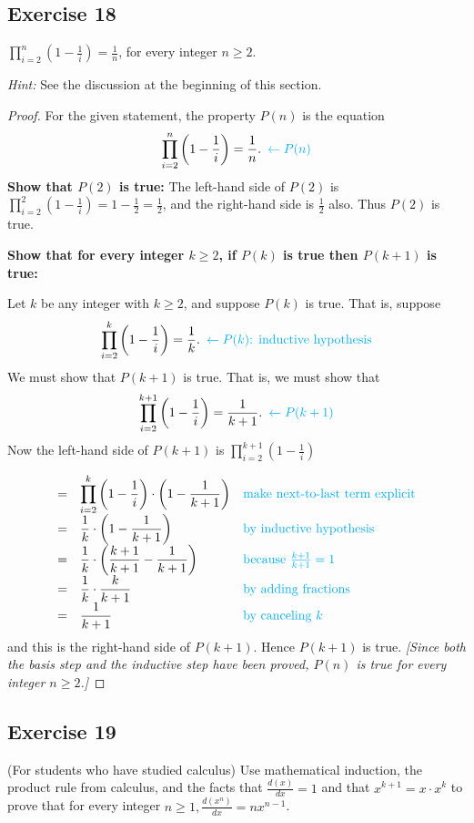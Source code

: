 \documentclass[14pt]{extarticle}
\newcommand{\dps}{\displaystyle}
\newcommand{\from}{\leftarrow}
\newcommand{\cy}{\color{cyan}}
\begin{document}
\subsection{Exercise 18}
$\dps \prod_{i=2}^{n}\left(1 - \frac{1}{i}\right) = \frac{1}{n}$, for every integer $n \geq 2$.

{\it Hint:} See the discussion at the beginning of this section.

\begin{proof}
For the given statement, the property $P(n)$ is the equation
\[
\dps \prod_{i=2}^{n}\left(1 - \frac{1}{i}\right) = \frac{1}{n}. \,\,\, {\cy \from P(n)}
\]
{\bf Show that $P(2)$ is true:} The left-hand side of $P(2)$ is $\dps \prod_{i=2}^{2}\left(1 - \frac{1}{i}\right) = 1 - \frac{1}{2} = \frac{1}{2}$, and the right-hand side is $\dps \frac{1}{2}$ also. Thus $P(2)$ is true.

{\bf Show that for every integer $k \geq 2$, if $P(k)$ is true then $P(k + 1)$ is true:}

Let $k$ be any integer with $k \geq 2$, and suppose $P(k)$ is true. That is, suppose
\[
\dps \prod_{i=2}^{k}\left(1 - \frac{1}{i}\right) = \frac{1}{k}. \,\,\, {\cy \from P(k) \text{: inductive hypothesis}}
\]
We must show that $P(k + 1)$ is true. That is, we must show that
\[
\dps \prod_{i=2}^{k+1}\left(1 - \frac{1}{i}\right) = \frac{1}{k+1}. \,\,\,{\cy \from P(k+1)}
\]
Now the left-hand side of $P(k + 1)$ is $\dps \prod_{i=2}^{k+1}\left(1 - \frac{1}{i}\right)$

\[
\begin{array}{lll}
= & \dps \prod_{i=2}^{k}\left(1 - \frac{1}{i}\right) \cdot \left(1 - \frac{1}{k+1}\right) & \text{\cy make next-to-last term explicit} \\
= & \dps \frac{1}{k} \cdot \left(1 - \frac{1}{k+1}\right) & \text{\cy by inductive hypothesis} \\
= & \dps \frac{1}{k} \cdot \left(\frac{k+1}{k+1} - \frac{1}{k+1}\right) & \text{\cy because $\frac{k+1}{k+1} = 1$} \\
= & \dps \frac{1}{k} \cdot \frac{k}{k+1} & \text{\cy by adding fractions} \\
= & \dps \frac{1}{k+1} & \text{\cy by canceling $k$}
\end{array}
\]
and this is the right-hand side of $P(k + 1)$. Hence $P(k + 1)$ is true. {\it [Since both the basis step and the inductive step have been proved, $P(n)$ is true for every integer $n \geq 2$.]}
\end{proof}

\subsection{Exercise 19}
(For students who have studied calculus) Use mathematical induction, the product rule from calculus, and the facts that $\dps \frac{d(x)}{dx} = 1$ and that $x^{k+1} = x\cdot x^k$ to prove that for every integer $\dps n \geq 1, \frac{d(x^n)}{dx} = n x^{n-1}$.
\end{document}
